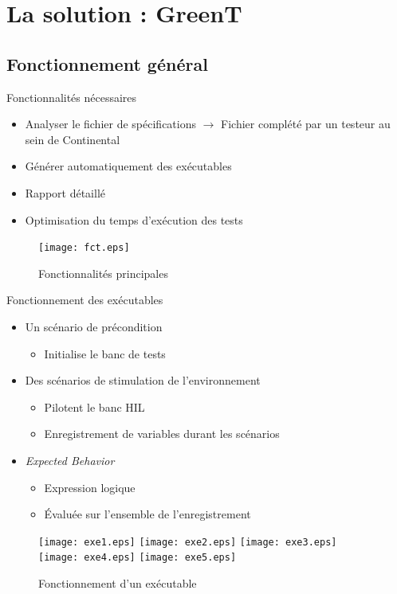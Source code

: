 \documentclass{beamer}
\begin{document}
\section{La solution : GreenT}
\subsection{Fonctionnement g\'en\'eral}
\begin{frame}{Fonctionnalités nécessaires}
\vspace{-10px}
	\begin{itemize}
		\item Analyser le fichier de spécifications\newline
			\footnotesize
			$\rightarrow$ Fichier complété par un testeur au sein de Continental
			\normalsize

		\item Générer automatiquement des  exécutables 
		\item Rapport détaillé
		\item Optimisation du temps d'exécution des tests
	\end{itemize}
	\vfill
	\begin{figure}[H]
		\centering
		\texttt{[image: fct.eps]}
		\caption{Fonctionnalités principales}
	\end{figure}

\end{frame}
\begin{frame}{Fonctionnement des exécutables}
	\begin{itemize}[<+->]
	  \vfill
		\item Un scénario de précondition
		\begin{itemize}
			\item Initialise le banc de tests
		\end{itemize}
	\vfill
		\item Des scénarios de stimulation de l'environnement
			\begin{itemize}
			\item Pilotent le banc HIL 
			\item Enregistrement de variables durant les scénarios
			\end{itemize}
	\vfill
		\item \textit{Expected Behavior }
			\begin{itemize}
				\item Expression logique 
				\item Évaluée sur l'ensemble de l'enregistrement
			\end{itemize}
			\vspace{-30px}
	\end{itemize}
	\begin{figure}[H]
		\centering
		 {
			\texttt{[image: exe1.eps]}
		}
		\only<3,4> {
			\texttt{[image: exe2.eps]}
		}
		\only<5> {
			\texttt{[image: exe3.eps]}
		}
		\only<6,7> {
			\texttt{[image: exe4.eps]}
		}
		\only<8> {
			\texttt{[image: exe5.eps]}
		}
		\caption{Fonctionnement d'un exécutable}
	\end{figure}
\end{frame}
\end{document}
